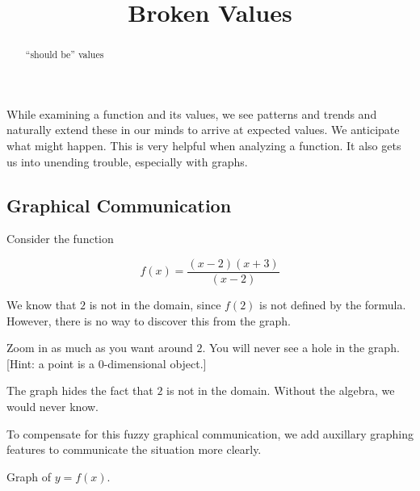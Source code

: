 \documentclass{ximera}
\title{Broken Values}
\begin{document}
\begin{abstract}
``should be'' values
\end{abstract}
\maketitle






While examining a function and its values, we see patterns and trends and naturally extend these in our minds to arrive at expected values. We anticipate what might happen.  This is very helpful when analyzing a function. It also gets us into unending trouble, especially with graphs.



\subsection{Graphical Communication}


Consider the function 

\[ f(x) = \frac{(x-2)(x+3)}{(x-2)} \]

We know that $2$ is not in the domain, since $f(2)$ is not defined  by the formula.  However, there is no way to discover this from the graph.


Zoom in as much as you want around $2$. You will never see a hole in the graph.  
[Hint: a point is a $0$-dimensional object.]

\begin{center}
\end{center}

The graph hides the fact that $2$ is not in the domain.  Without the algebra, we would never know.

To compensate for this fuzzy graphical communication, we add auxillary graphing features to communicate the situation more clearly.



Graph of $y = f(x)$.

\begin{image}
\end{image}
\end{document}
